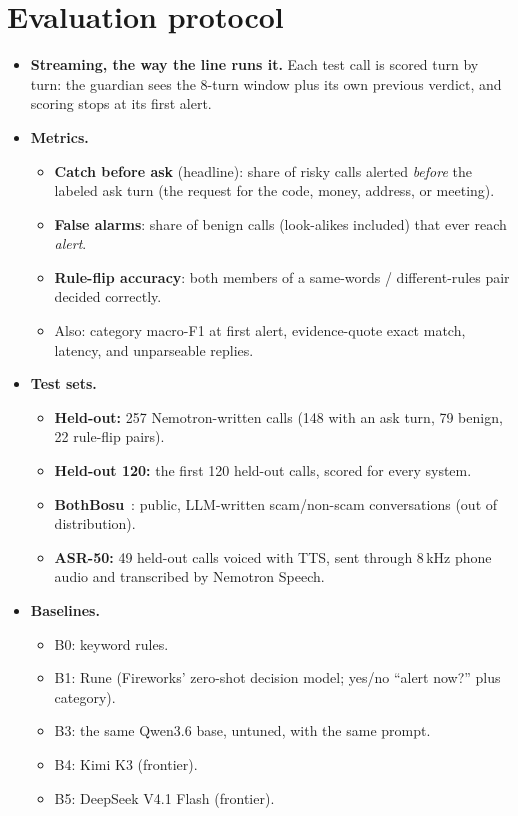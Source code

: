 \documentclass[11pt]{article}
\begin{document}
\section{Evaluation protocol}
\begin{itemize}
\item \textbf{Streaming, the way the line runs it.} Each test call is scored turn by turn: the guardian sees the 8-turn window plus its own previous verdict, and scoring stops at its first alert.
\item \textbf{Metrics.}
\begin{itemize}
\item \textbf{Catch before ask} (headline): share of risky calls alerted \emph{before} the labeled ask turn (the request for the code, money, address, or meeting).
\item \textbf{False alarms}: share of benign calls (look-alikes included) that ever reach \emph{alert}.
\item \textbf{Rule-flip accuracy}: both members of a same-words / different-rules pair decided correctly.
\item Also: category macro-F1 at first alert, evidence-quote exact match, latency, and unparseable replies.
\end{itemize}
\item \textbf{Test sets.}
\begin{itemize}
\item \textbf{Held-out:} 257 Nemotron-written calls (148 with an ask turn, 79 benign, 22 rule-flip pairs).
\item \textbf{Held-out 120:} the first 120 held-out calls, scored for every system.
\item \textbf{BothBosu}~\cite{bothbosu}: public, LLM-written scam/non-scam conversations (out of distribution).
\item \textbf{ASR-50:} 49 held-out calls voiced with TTS, sent through 8\,kHz phone audio and transcribed by Nemotron Speech.
\end{itemize}
\item \textbf{Baselines.}
\begin{itemize}
\item B0: keyword rules.
\item B1: Rune (Fireworks' zero-shot decision model; yes/no ``alert now?'' plus category).
\item B3: the same Qwen3.6 base, untuned, with the same prompt.
\item B4: Kimi K3 (frontier).
\item B5: DeepSeek V4.1 Flash (frontier).
\end{itemize}
\end{itemize}
\end{document}
